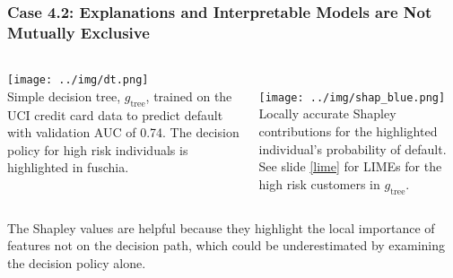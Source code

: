 \documentclass[11pt,aspectratio=169,hyperref={colorlinks}]{beamer}
\begin{document}
	\begin{frame}[label={dt}]
	
		\frametitle{\normalsize\textbf{Case 4.2}: Explanations and Interpretable Models are \textbf{Not Mutually Exclusive}}
		
		\begin{columns}
				
			\centering		
			\texttt{[image: ../img/dt.png]}\\
			\vspace{5pt}
  			\tiny{Simple decision tree, $g_{\text{tree}}$, trained on the UCI credit card data to predict default with validation AUC of 0.74. The decision policy for high risk individuals is highlighted in \textcolor{fuschia}{fuschia}.}

			\hspace{50pt}
			\centering
			\vspace{2pt}\\
  			\texttt{[image: ../img/shap\_blue.png]}\\
  			\vspace{5pt}
  			\tiny{Locally accurate Shapley contributions for the highlighted individual's probability of default. See slide \ref{lime} for LIMEs for the high risk customers in $g_{\text{tree}}$.}

		\end{columns}
		\vspace{10pt}

	\scriptsize{The Shapley values are helpful because they highlight the local importance of features not on the decision path, which could be underestimated by examining the decision policy alone.}
	
	\end{frame}
	
\end{document}
